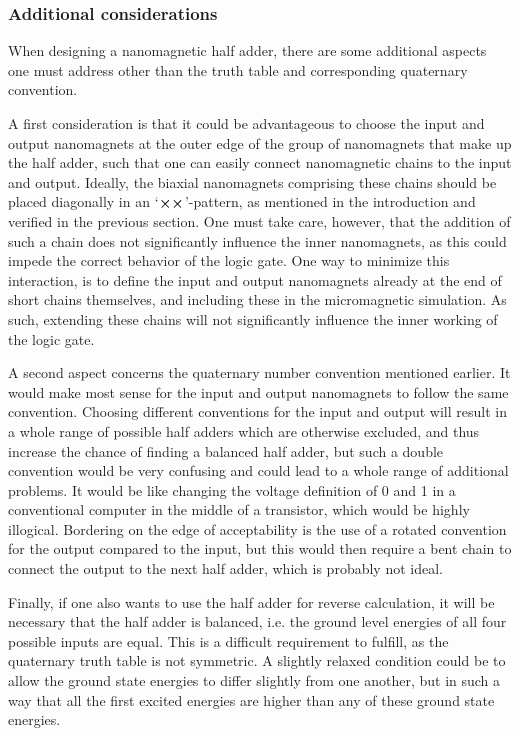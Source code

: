 \documentclass[11pt,a4paper,english]{article}
\begin{document}
\subsubsection{Additional considerations}
When designing a nanomagnetic half adder, there are some additional aspects one must address other than the truth table and corresponding quaternary convention. \par
A first consideration is that it could be advantageous to choose the input and output nanomagnets at the outer edge of the group of nanomagnets that make up the half adder, such that one can easily connect nanomagnetic chains to the input and output. Ideally, the biaxial nanomagnets comprising these chains should be placed diagonally in an `$\cross \cross$'-pattern, as mentioned in the introduction and verified in the previous section. One must take care, however, that the addition of such a chain does not significantly influence the inner nanomagnets, as this could impede the correct behavior of the logic gate. One way to minimize this interaction, is to define the input and output nanomagnets already at the end of short chains themselves, and including these in the micromagnetic simulation. As such, extending these chains will not significantly influence the inner working of the logic gate. \par
A second aspect concerns the quaternary number convention mentioned earlier. It would make most sense for the input and output nanomagnets to follow the same convention. Choosing different conventions for the input and output will result in a whole range of possible half adders which are otherwise excluded, and thus increase the chance of finding a balanced half adder, but such a double convention would be very confusing and could lead to a whole range of additional problems. It would be like changing the voltage definition of 0 and 1 in a conventional computer in the middle of a transistor, which would be highly illogical. Bordering on the edge of acceptability is the use of a rotated convention for the output compared to the input, but this would then require a bent chain to connect the output to the next half adder, which is probably not ideal. \par
Finally, if one also wants to use the half adder for reverse calculation, it will be necessary that the half adder is balanced, i.e. the ground level energies of all four possible inputs are equal. This is a difficult requirement to fulfill, as the quaternary truth table is not symmetric. A slightly relaxed condition could be to allow the ground state energies to differ slightly from one another, but in such a way that all the first excited energies are higher than any of these ground state energies. \par
\end{document}
